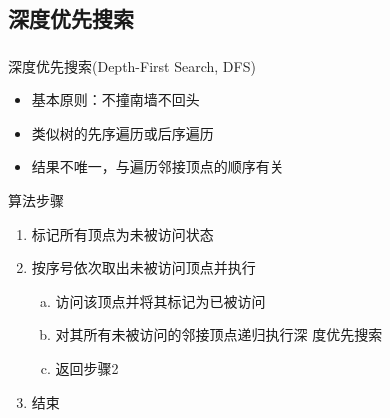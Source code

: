\subsection{深度优先搜索}

\begin{frame}
    \frametitle{\insertsubsectionhead}
    \begin{block}{深度优先搜索(Depth-First Search, DFS)}
        \begin{itemize}
            \item 基本原则：不撞南墙不回头
            \item 类似树的先序遍历或后序遍历
            \item 结果不唯一，与遍历邻接顶点的顺序有关
        \end{itemize}
    \end{block}
    \begin{alertblock}{算法步骤}
        \begin{enumerate}
            \item 标记所有顶点为\alert{未被访问}状态
            \item 按序号依次取出\alert{未被访问}顶点并执行
                  \begin{enumerate}[a.]
                      \item 访问该顶点并将其标记为\alert{已被访问}
                      \item 对其所有\alert{未被访问}的\alert{邻接}顶点递归执行深
                            度优先搜索
                      \item 返回步骤2
                  \end{enumerate}
            \item 结束
        \end{enumerate}
    \end{alertblock}
\end{frame}

